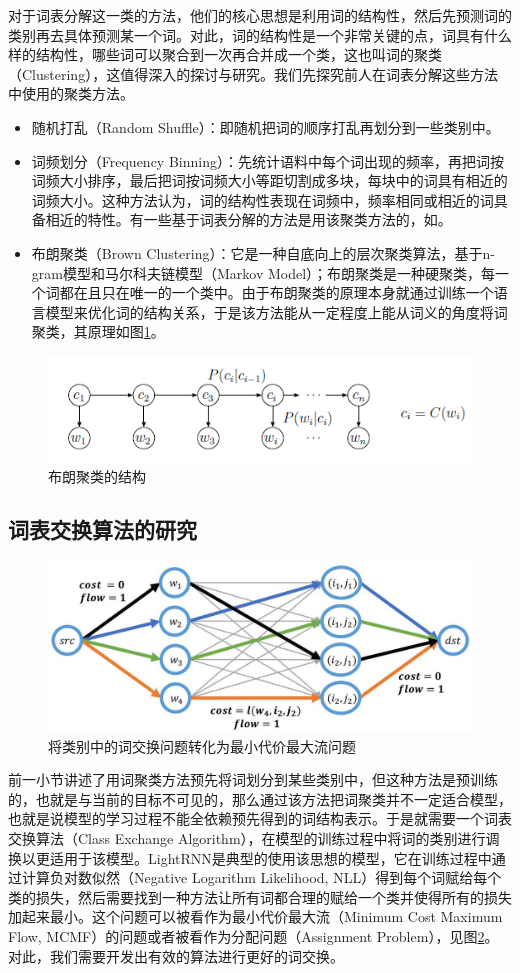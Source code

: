 \documentclass[12pt,a4paper]{article}
\begin{document}
对于词表分解这一类的方法，他们的核心思想是利用词的结构性，然后先预测词的类别再去具体预测某一个词。对此，词的结构性是一个非常关键的点，词具有什么样的结构性，哪些词可以聚合到一次再合并成一个类，这也叫词的聚类（Clustering），这值得深入的探讨与研究。我们先探究前人在词表分解这些方法中使用的聚类方法。
\begin{itemize}
  \item 随机打乱（Random Shuffle）：即随机把词的顺序打乱再划分到一些类别中。
  \item 词频划分（Frequency Binning）：先统计语料中每个词出现的频率，再把词按词频大小排序，最后把词按词频大小等距切割成多块，每块中的词具有相近的词频大小。这种方法认为，词的结构性表现在词频中，频率相同或相近的词具备相近的特性。有一些基于词表分解的方法是用该聚类方法的，如\cite{DBLP:conf/nips/MikolovSCCD13,DBLP:conf/acl/ChenGA16}。
  \item 布朗聚类（Brown Clustering）：它是一种自底向上的层次聚类算法，基于n-gram模型和马尔科夫链模型（Markov Model）；布朗聚类是一种硬聚类，每一个词都在且只在唯一的一个类中。由于布朗聚类的原理本身就通过训练一个语言模型来优化词的结构关系，于是该方法能从一定程度上能从词义的角度将词聚类，其原理如图\ref{fig:brown_cluster}。
\end{itemize}
\begin{figure}[!h]
  \centering
  \includegraphics[width=0.65\columnwidth]{./figures/brown_clustering.png}
  \caption{布朗聚类的结构}
  \label{fig:brown_cluster}
\end{figure}

\subsection{词表交换算法的研究}
\begin{figure}
  \centering
  \includegraphics[width=0.65\columnwidth]{./figures/mcmf.jpg}
  \caption{将类别中的词交换问题转化为最小代价最大流问题}
  \label{fig:mcmf}
\end{figure}
前一小节讲述了用词聚类方法预先将词划分到某些类别中，但这种方法是预训练的，也就是与当前的目标不可见的，那么通过该方法把词聚类并不一定适合模型，也就是说模型的学习过程不能全依赖预先得到的词结构表示。于是就需要一个词表交换算法（Class Exchange Algorithm），在模型的训练过程中将词的类别进行调换以更适用于该模型。LightRNN是典型的使用该思想的模型，它在训练过程中通过计算负对数似然（Negative Logarithm Likelihood, NLL）得到每个词赋给每个类的损失，然后需要找到一种方法让所有词都合理的赋给一个类并使得所有的损失加起来最小。这个问题可以被看作为最小代价最大流（Minimum Cost Maximum Flow, MCMF）的问题或者被看作为分配问题（Assignment Problem），见图\ref{fig:mcmf}。对此，我们需要开发出有效的算法进行更好的词交换。
\end{document}
